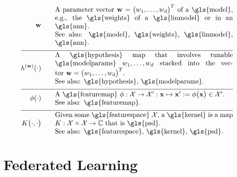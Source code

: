 \begin{align} 
	\weights  \quad\quad & \parbox{.75\textwidth}{A parameter vector $\weights = \big(\weight_{1},\ldots,\weight_{\featuredim}\big)^{T}$ 
		of a \gls{model}, e.g., the \gls{weights} of a \gls{linmodel} or in an \gls{ann}.
		\\ See also: \gls{model}, \gls{weights}, \gls{linmodel}, \gls{ann}. }     \nonumber \\[2mm] \hline \nonumber\\[-5mm]
	\hypothesis^{(\weights)}(\cdot)  \quad\quad &\parbox{.75\textwidth}{A \gls{hypothesis} map that involves tunable \gls{modelparams} 
		$\weight_{1},\ldots,\weight_{\featuredim}$ stacked into the vector $\weights=\big(\weight_{1},\ldots,\weight_{\featuredim} \big)^{T}$.
		\\ See also: \gls{hypothesis}, \gls{modelparams}. } \nonumber \\[2mm] \hline \nonumber\\[-5mm]
	\featuremap(\cdot)  \quad\quad & \parbox{.75\textwidth}{A \gls{featuremap} 
		$\featuremap: \featurespace \rightarrow \featurespace' : \featurevec \mapsto \featurevec' \defeq \featuremap\big( \featurevec \big) \in \featurespace'$.
		\\ See also: \gls{featuremap}. }   \nonumber \\[2mm] \hline \nonumber\\[-5mm]
	\kernelmap{\cdot}{\cdot} \quad\quad & \parbox{.75\textwidth}{Given some \gls{featurespace} $\featurespace$, 
		a \gls{kernel} is a map $\kernel: \featurespace \times \featurespace \rightarrow \mathbb{C}$ that is \gls{psd}.
		\\ See also: \gls{featurespace}, \gls{kernel}, \gls{psd}. }    \nonumber                                                                                                                                                     
\end{align}              






\newpage
\section*{Federated Learning}

